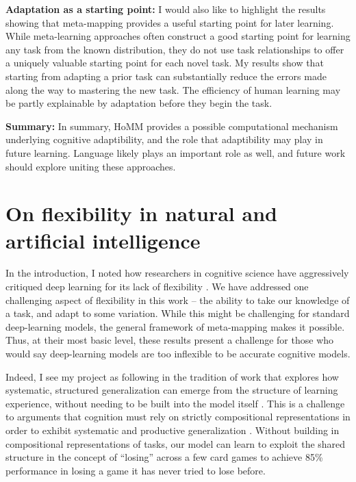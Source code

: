 \textbf{Adaptation as a starting point:} I would also like to highlight the results showing that meta-mapping provides a useful starting point for later learning. While meta-learning approaches often construct a good starting point for learning any task from the known distribution, they do not use task relationships to offer a uniquely valuable starting point for each novel task. My results show that starting from adapting a prior task can substantially reduce the errors made along the way to mastering the new task. The efficiency of human learning may be partly explainable by adaptation before they begin the task. \par 

\textbf{Summary:} In summary, HoMM provides a possible computational mechanism underlying cognitive adaptibility, and the role that adaptibility may play in future learning. Language likely plays an important role as well, and future work should explore uniting these approaches. 

\section{On flexibility in natural and artificial intelligence}

In the introduction, I noted how researchers in cognitive science have aggressively critiqued deep learning for its lack of flexibility \citep[e.g.][]{Lake2015, Lake2016, Lake2017, Marcus2018}. We have addressed one challenging aspect of flexibility in this work -- the ability to take our knowledge of a task, and adapt to some variation. While this might be challenging for standard deep-learning models, the general framework of meta-mapping makes it possible. Thus, at their most basic level, these results present a challenge for those who would say deep-learning models are too inflexible to be accurate cognitive models. \par  
Indeed, I see my project as following in the tradition of work that explores how systematic, structured generalization can emerge from the structure of learning experience, without needing to be built into the model itself \citep{McClelland2010a, McClelland2010, Hansen2017}. This is a challenge to arguments that cognition must rely on strictly compositional representations in order to exhibit systematic and productive generalization \citep[e.g.][]{Fodor2001, Fodor2008lot2, Lake2017}. Without building in compositional representations of tasks, our model can learn to exploit the shared structure in the concept of ``losing'' across a few card games to achieve 85\% performance in losing a game it has never tried to lose before. \par 

